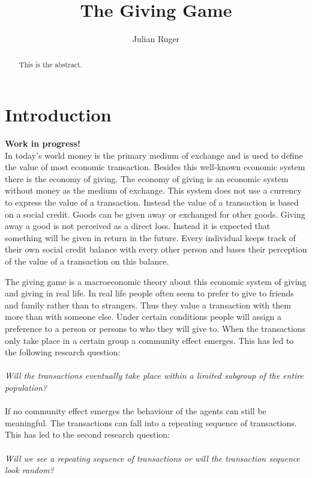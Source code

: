 \documentclass[twoside,openright]{uva-bachelor-thesis}
\title{The Giving Game}
\author{Julian Ruger}
\begin{document}
\maketitle

\begin{abstract}
This is the abstract. 
\end{abstract}

\tableofcontents

\chapter{Introduction}
\textbf{Work in progress!}
\\
In today’s world money is the primary medium of exchange and is used to define the value of most economic transaction. Besides this well-known  economic system there is the economy of giving. The economy of giving is an economic  system without money as the medium of exchange. This system does not use a currency to express the value of a transaction. Instead the value of a transaction is based on a social credit. Goods can be given away or exchanged for other goods. Giving away a good is not perceived as a direct loss. Instead it is expected that something will be given in return in the future. Every individual keeps track of their own social credit balance with every other person and bases their perception of the value of a transaction on this balance. 

The giving game is a macroeconomic theory about this economic system of giving and giving in real life. In real life people often seem to prefer to give to friends and family rather than to strangers. Thus they value a transaction with them more than with someone else.  Under certain conditions people will assign a preference to a person or persons to who they will give to. When the transactions only take place in a certain group a community effect emerges. This has led to the following research question:
\\
\\
\textit{Will the transactions eventually take place within a limited subgroup of the entire population?}
\\
\\
If no community effect emerges the behaviour of the agents can still be meaningful. The transactions can fall into a repeating sequence of transactions. This has led to the second research question:
\\
\\
\textit{Will we see a repeating sequence of transactions or will the transaction sequence look random?}
\end{document}
